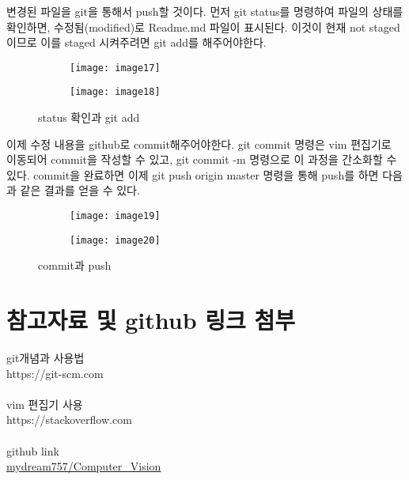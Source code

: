 \documentclass[titlepage]{article}
\begin{document}
\par
\noindent 변경된 파일을 git을 통해서 push할 것이다. 먼저 git status를 명령하여 파일의 상태를 확인하면, 수정됨(modified)로 Readme.md 파일이 표시된다. 이것이 현재 not staged이므로 이를 staged 시켜주려면 git add를 해주어야한다.\\
\begin{figure}[h]
 
		\begin{subfigure}{0.5\textwidth}
		\texttt{[image: image17]} 
		\end{subfigure}
		\begin{subfigure}{0.5\textwidth}
		\texttt{[image: image18]}
		
	
		\end{subfigure}
 
		\caption{status 확인과 git add}
		\label{fig:figure10}
		\end{figure}
		\par
\noindent 이제 수정 내용을 github로 commit해주어야한다. git commit 명령은 vim 편집기로 이동되어 commit을 작성할 수 있고, git commit -m 명령으로 이 과정을 간소화할 수 있다. commit을 완료하면 이제 git push origin master 명령을 통해 push를 하면 다음과 같은 결과를 얻을 수 있다.\\

\begin{figure}[h]
 
		\begin{subfigure}{0.5\textwidth}
		\texttt{[image: image19]} 
		\end{subfigure}
		\begin{subfigure}{0.5\textwidth}
		\texttt{[image: image20]}
		
	
		\end{subfigure}
 
		\caption{commit과 push}
		\label{fig:figure11}
		\end{figure}
		
		\newpage
\section{ 참고자료 및 github 링크 첨부}
git개념과 사용법\\
https://git-scm.com\\\\

vim 편집기 사용\\
https://stackoverflow.com\\\\

github link\\
\href{http://www.github.com/mydream757/Computer\_Vision}{mydream757/Computer\_Vision}
\end{document}
